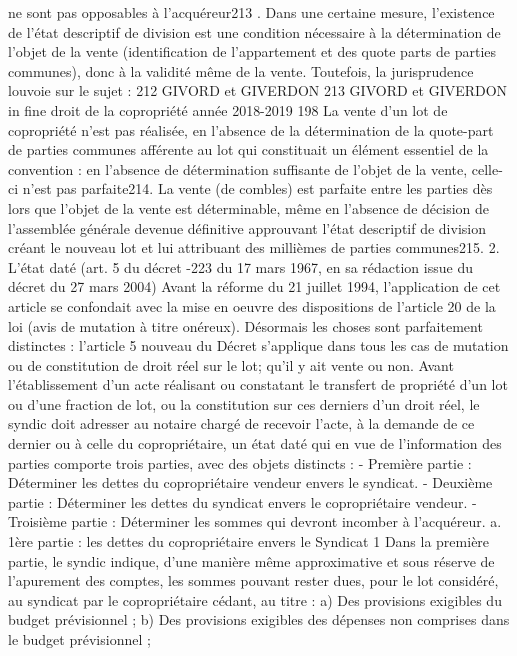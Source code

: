 	ne sont pas opposables à l'acquéreur213 .
	Dans une certaine mesure, l’existence de l’état descriptif de division est une condition nécessaire à la
	détermination de l’objet de la vente (identification de l’appartement et des quote parts de parties
	communes), donc à la validité même de la vente. Toutefois, la jurisprudence louvoie sur le sujet :
	212 GIVORD et GIVERDON 
	213 GIVORD et GIVERDON  in fine
	droit de la copropriété année 2018-2019
	198
	La vente d’un lot de copropriété n’est pas réalisée, en l’absence de la détermination de la quote-part de
	parties communes afférente au lot qui constituait un élément essentiel de la convention : en l’absence de
	détermination suffisante de l’objet de la vente, celle-ci n’est pas parfaite214.
	La vente (de combles) est parfaite entre les parties dès lors que l’objet de la vente est déterminable, même
	en l’absence de décision de l’assemblée générale devenue définitive approuvant l’état descriptif de
	division créant le nouveau lot et lui attribuant des millièmes de parties communes215.
	2. L’état daté (art. 5 du décret -223 du 17 mars 1967, en sa rédaction issue
	du décret du 27 mars 2004)
	Avant la réforme du 21 juillet 1994, l'application de cet article se confondait avec la mise en oeuvre des
	dispositions de l'article 20 de la loi (avis de mutation à titre onéreux). Désormais les choses sont
	parfaitement distinctes : l'article 5 nouveau du Décret s'applique dans tous les cas de mutation ou de
	constitution de droit réel sur le lot; qu'il y ait vente ou non.
	Avant l'établissement d'un acte réalisant ou constatant le transfert de propriété d'un lot ou d'une fraction
	de lot, ou la constitution sur ces derniers d'un droit réel, le syndic doit adresser au notaire chargé de
	recevoir l'acte, à la demande de ce dernier ou à celle du copropriétaire, un état daté qui en vue de
	l'information des parties comporte trois parties, avec des objets distincts :
	- Première partie : Déterminer les dettes du copropriétaire vendeur envers le syndicat.
	- Deuxième partie : Déterminer les dettes du syndicat envers le copropriétaire vendeur.
	- Troisième partie : Déterminer les sommes qui devront incomber à l’acquéreur.
	a. 1ère partie : les dettes du copropriétaire envers le Syndicat
	1\degre{} Dans la première partie, le syndic indique, d'une manière même approximative et sous réserve de
	l'apurement des comptes, les sommes pouvant rester dues, pour le lot considéré, au syndicat par le
	copropriétaire cédant, au titre :
	a) Des provisions exigibles du budget prévisionnel ;
	b) Des provisions exigibles des dépenses non comprises dans le budget prévisionnel ;
